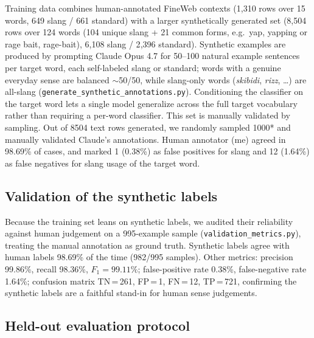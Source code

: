 \documentclass[11pt]{article}
\begin{document}
Training data combines human-annotated FineWeb contexts (1{,}310 rows over 15 words, 649 slang / 661 standard) with a larger synthetically generated set (8{,}504 rows over 124 words (104 unique slang + 21 common forms, e.g.\ yap, yapping or rage bait, rage-bait), 6{,}108 slang / 2{,}396 standard). Synthetic examples are produced by prompting Claude Opus 4.7 for 50--100 natural example sentences per target word, each self-labeled slang or standard; words with a genuine everyday sense are balanced $\sim$50/50, while slang-only words (\textit{skibidi}, \textit{rizz}, \dots) are all-slang (\texttt{generate\_synthetic\_annotations.py}). Conditioning the classifier on the target word lets a single model generalize across the full target vocabulary rather than requiring a per-word classifier.
This set is manually validated by sampling. Out of 8504 text rows generated, we randomly sampled 1000* and manually validated Claude’s annotations.
Human annotator (me) agreed in 98.69\% of cases, and marked 1 (0.38\%) as false positives for slang and 12 (1.64\%) as false negatives for slang usage of the target word.


\subsection{Validation of the synthetic labels}

Because the training set leans on synthetic labels, we audited their reliability against human judgement on a 995-example sample (\texttt{validation\_metrics.py}), treating the manual annotation as ground truth. Synthetic labels agree with human labels 98.69\% of the time (982/995 samples). Other metrics: precision 99.86\%, recall 98.36\%, $F_1 = 99.11\%$; false-positive rate 0.38\%, false-negative rate 1.64\%; confusion matrix TN\,=\,261, FP\,=\,1, FN\,=\,12, TP\,=\,721, confirming the synthetic labels are a faithful stand-in for human sense judgements.

\subsection{Held-out evaluation protocol}
\end{document}
